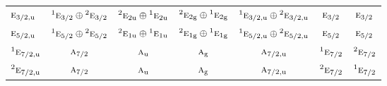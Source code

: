 \documentclass[10pt,a4paper]{article}
\numberwithin{equation}{section}
\newcommand{\irr}[1]{\text{\normalfont\scshape #1}}
\newcommand{\conjpair}[1]{{}^{#1}}
\newcommand{\ptag}[1]{\mathrm{#1}}
\begin{document}
{\begin{longtable}{@{}lcccccc@{}}
$\irr{e}_{3/2,\ptag{u}}$ & $\conjpair{1}\irr{e}_{3/2}\oplus \conjpair{2}\irr{e}_{3/2}$ & $\conjpair{2}\irr{e}_{2\ptag{u}}\oplus \conjpair{1}\irr{e}_{2\ptag{u}}$ & $\conjpair{2}\irr{e}_{2\ptag{g}}\oplus \conjpair{1}\irr{e}_{2\ptag{g}}$ & $\conjpair{1}\irr{e}_{3/2,\ptag{u}}\oplus \conjpair{2}\irr{e}_{3/2,\ptag{u}}$ & $\irr{e}_{3/2}$ & $\irr{e}_{3/2}$\\
$\irr{e}_{5/2,\ptag{u}}$ & $\conjpair{1}\irr{e}_{5/2}\oplus \conjpair{2}\irr{e}_{5/2}$ & $\conjpair{2}\irr{e}_{1\ptag{u}}\oplus \conjpair{1}\irr{e}_{1\ptag{u}}$ & $\conjpair{2}\irr{e}_{1\ptag{g}}\oplus \conjpair{1}\irr{e}_{1\ptag{g}}$ & $\conjpair{1}\irr{e}_{5/2,\ptag{u}}\oplus \conjpair{2}\irr{e}_{5/2,\ptag{u}}$ & $\irr{e}_{5/2}$ & $\irr{e}_{5/2}$\\
$\conjpair{1}\irr{e}_{7/2,\ptag{u}}$ & $\irr{a}_{7/2}$ & $\irr{a}_{\ptag{u}}$ & $\irr{a}_{\ptag{g}}$ & $\irr{a}_{7/2,\ptag{u}}$ & $\conjpair{1}\irr{e}_{7/2}$ & $\conjpair{2}\irr{e}_{7/2}$\\*
$\conjpair{2}\irr{e}_{7/2,\ptag{u}}$ & $\irr{a}_{7/2}$ & $\irr{a}_{\ptag{u}}$ & $\irr{a}_{\ptag{g}}$ & $\irr{a}_{7/2,\ptag{u}}$ & $\conjpair{2}\irr{e}_{7/2}$ & $\conjpair{1}\irr{e}_{7/2}$\\
\bottomrule\end{longtable}}
\end{document}
